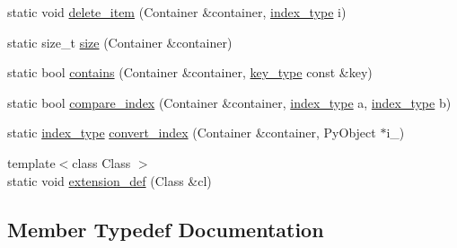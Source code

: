 \begin{DoxyCompactItemize}
\item 
static void \hyperlink{classboost_1_1python_1_1std__map__indexing__suite_a9af154020b49d26a30de90bfb07b122d}{delete\+\_\+item} (Container \&container, \hyperlink{classboost_1_1python_1_1std__map__indexing__suite_a4b2ac75883fba93dbca6d9e83197c842}{index\+\_\+type} i)
\item 
static size\+\_\+t \hyperlink{classboost_1_1python_1_1std__map__indexing__suite_a2a7b98e15824d0e74ae4620cbfa636d0}{size} (Container \&container)
\item 
static bool \hyperlink{classboost_1_1python_1_1std__map__indexing__suite_a89557475c8931027399dddf66fb251c1}{contains} (Container \&container, \hyperlink{classboost_1_1python_1_1std__map__indexing__suite_a4e2daeb60a58d6ce9964e0ea27680009}{key\+\_\+type} const \&key)
\item 
static bool \hyperlink{classboost_1_1python_1_1std__map__indexing__suite_a62974da613b1b56663d9736a8612bddd}{compare\+\_\+index} (Container \&container, \hyperlink{classboost_1_1python_1_1std__map__indexing__suite_a4b2ac75883fba93dbca6d9e83197c842}{index\+\_\+type} a, \hyperlink{classboost_1_1python_1_1std__map__indexing__suite_a4b2ac75883fba93dbca6d9e83197c842}{index\+\_\+type} b)
\item 
static \hyperlink{classboost_1_1python_1_1std__map__indexing__suite_a4b2ac75883fba93dbca6d9e83197c842}{index\+\_\+type} \hyperlink{classboost_1_1python_1_1std__map__indexing__suite_a79bc222baa6b652f2f688f2a3add9d75}{convert\+\_\+index} (Container \&container, Py\+Object $\ast$i\+\_\+)
\item 
{\footnotesize template$<$class Class $>$ }\\static void \hyperlink{classboost_1_1python_1_1std__map__indexing__suite_a32aecfee63f8763608a0149050134623}{extension\+\_\+def} (Class \&cl)
\end{DoxyCompactItemize}


\subsection{Member Typedef Documentation}
\hypertarget{classboost_1_1python_1_1std__map__indexing__suite_aae0c4473455223a4e048cc207ca7b3ea}{}
